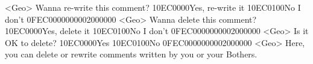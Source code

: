 <Geo> Wanna re-write this comment? {10}{EC}{00}{00}Yes, re-write it {10}{EC}{01}{00}No I don't {0F}{EC}{00}{00}{00}{00}{02}{00}{00}{00}
<Geo> Wanna delete this comment? {10}{EC}{00}{00}Yes, delete it {10}{EC}{01}{00}No I don't {0F}{EC}{00}{00}{00}{00}{02}{00}{00}{00}
<Geo> Is it OK to delete? {10}{EC}{00}{00}Yes {10}{EC}{01}{00}No {0F}{EC}{00}{00}{00}{00}{02}{00}{00}{00}
<Geo> Here, you can delete or rewrite comments written by you or your Bothers. 
